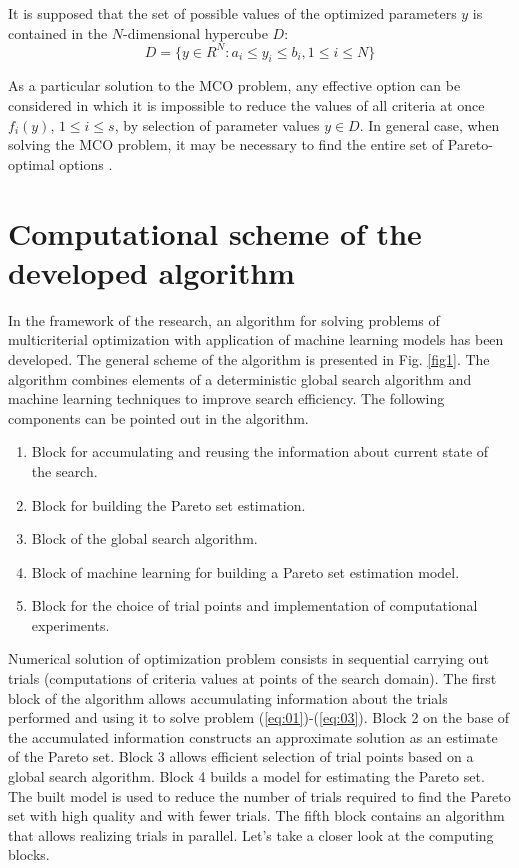 \documentclass[runningheads]{llncs}
\begin{document}
It is supposed that the set of possible values of the optimized parameters $y$ is contained in the $N$-dimensional hypercube $D$:
\begin{equation}
\label{eq:03}
    D=\{y \in R^N : a_i \leq y_i \leq b_i, 1 \leq i \leq N\}
\end{equation}

As a particular solution to the MCO problem, any effective option can be considered in which it is impossible to reduce the values of all criteria at once $f_i(y)$, $1 \leq i \leq s$, by selection of parameter values $y \in D$. In general case, when solving the MCO problem, it may be necessary to find the entire set of Pareto-optimal options \cite{Miettinen1999,Ehrgott2005,Pardalos2017}.


\section{Computational scheme of the developed algorithm}
\label{sec3}

In the framework of the research, an algorithm for solving problems of multicriterial optimization with application of machine learning models has been developed. The general scheme of the algorithm is presented in Fig. \ref{fig1}. The algorithm combines elements of a deterministic global search algorithm and machine learning techniques to improve search efficiency. The following components can be pointed out in the algorithm.
\begin{enumerate}
	\item Block for accumulating and reusing the information about current state of the search.
	\item Block for building the Pareto set estimation. 
	\item Block of the global search algorithm. 
	\item Block of machine learning for building a Pareto set estimation model. 
	\item Block for the choice of trial points and implementation of computational experiments.
\end{enumerate}

Numerical solution of optimization problem consists in sequential carrying out trials (computations of criteria values at points of the search domain). The first block of the algorithm allows accumulating information about the trials performed and using it to solve problem (\ref{eq:01})-(\ref{eq:03}). Block 2 on the base of the accumulated information constructs an approximate solution as an estimate of the Pareto set. Block 3 allows efficient selection of trial points based on a global search algorithm. Block 4 builds a model for estimating the Pareto set. The built model is used to reduce the number of trials required to find the Pareto set with high quality and with fewer trials. The fifth block contains an algorithm that allows realizing trials in parallel. Let's take a closer look at the computing blocks.
\end{document}

